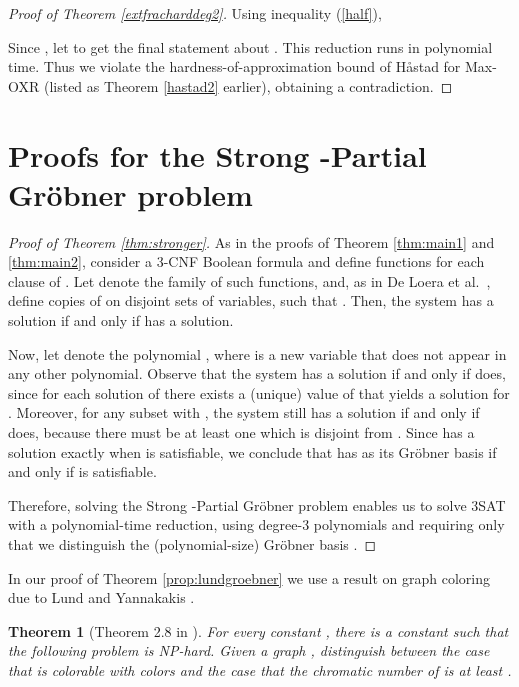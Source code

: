 \documentclass{article}
\newtheorem{thm}{Theorem}
\begin{document}
\begin{proof}[Proof of Theorem \ref{extfracharddeg2}]
Using inequality (\ref{half}),







\noindent 
Since , let  to get the final statement about . This reduction runs in polynomial time. Thus we violate the hardness-of-approximation bound of H{\aa}stad for Max\nobreakdash-OXR (listed as Theorem \ref{hastad2} earlier), obtaining a contradiction.
\end{proof}






\section{Proofs for the Strong \nobreakdash-Partial Gr\"{o}bner problem}
\label{sec:partial}

\begin{proof}[Proof of Theorem \ref{thm:stronger}]
As in the proofs of Theorem \ref{thm:main1} and \ref{thm:main2}, consider a 3-CNF Boolean formula  and define functions  for each clause  of . Let  denote the family of such functions, and, as in De Loera et al.~\cite{deloera}, define  copies  of  on disjoint sets of variables, such that . Then, the system  has a solution if and only if  has a solution.

Now, let  denote the polynomial , where  is a new variable that does not appear in any other polynomial. Observe that the system  has a solution if and only if  does, since for each solution of  there exists a (unique) value of  that yields a solution for .  Moreover, for any subset  with , the system  still has a solution if and only if  does, because there must be at least one  which is disjoint from . Since  has a solution exactly when  is satisfiable, we conclude that  has  as its Gr\"obner basis if and only if  is satisfiable.

Therefore, solving the Strong \nobreakdash-Partial Gr\"obner problem enables us to solve 3SAT with a polynomial-time reduction, using degree-3 polynomials and requiring only that we distinguish the (polynomial-size) Gr\"obner basis . 
\end{proof}

In our proof of Theorem \ref{prop:lundgroebner} we use a result on graph coloring due to Lund and Yannakakis \cite{lund}.

\begin{thm}[Theorem 2.8 in \cite{lund}]\label{lundy}  For every constant , there is a constant  such that the following problem is NP-hard. Given a graph , distinguish between the case that  is colorable with  colors and the case that the chromatic number of  is at least .
\end{thm}
\end{document}
